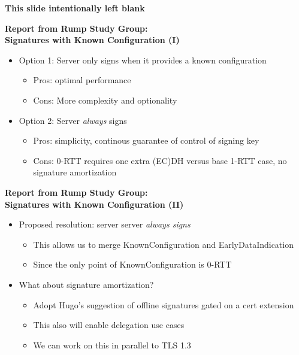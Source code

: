\documentclass[helvetica]{seminar}
\newcommand{\heading}[1]{%
  \begin{center} 
    \large\bf 
    #1 
  \end{center} 
  \vspace{.4 in}}
\begin{document}
\begin{slide}
\heading{This slide intentionally left blank}
\end{slide}


\begin{slide}
\heading{Report from Rump Study Group:\\Signatures with Known Configuration (I)}

\begin{itemize}
\item Option 1: Server only signs when it provides a known configuration
  \begin{itemize}
  \item Pros: optimal performance
  \item Cons: More complexity and optionality
  \end{itemize}

\item Option 2: Server \emph{always} signs
  \begin{itemize}
  \item Pros: simplicity, continous guarantee of control of signing key
  \item Cons: 0-RTT requires one extra (EC)DH versus base 1-RTT case, no signature amortization
  \end{itemize}
\end{itemize}
\end{slide}

\begin{slide}
\heading{Report from Rump Study Group:\\Signatures with Known Configuration (II)}

\begin{itemize}
\item Proposed resolution: server server \emph{always signs}
  \begin{itemize}
  \item This allows us to merge KnownConfiguration and EarlyDataIndication
  \item Since the only point of KnownConfiguration is 0-RTT
  \end{itemize}

\item What about signature amortization?
  \begin{itemize}
  \item Adopt Hugo's suggestion of offline signatures gated on a cert
    extension
  \item This also will enable delegation use cases
  \item We can work on this in parallel to TLS 1.3
  \end{itemize}
\end{itemize}
\end{slide}
\end{document}

